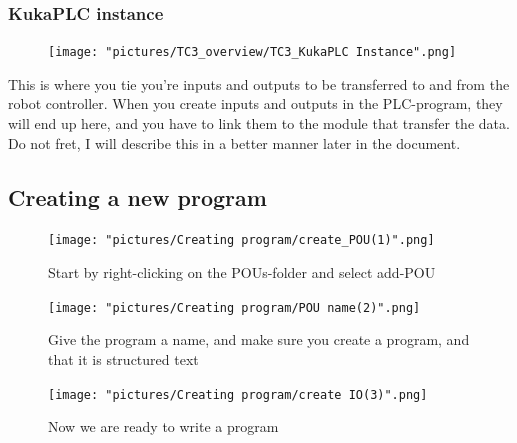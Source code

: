 \documentclass{article}
\begin{document}
\newpage

\subsubsection{KukaPLC instance}
\begin{figure}[!h]
    \centering
    \texttt{[image: "pictures/TC3\_overview/TC3\_KukaPLC Instance".png]}
    \caption{}
    \label{fig:my_label}
\end{figure}

This is where you tie you're inputs and outputs to be transferred to and from the robot controller. When you create inputs and outputs in the PLC-program, they will end up here, and you have to link them to the module that transfer the data. Do not fret, I will describe this in a better manner later in the document. 

\newpage

\subsection{Creating a new program}


\begin{figure}[!h]
    \centering
    \texttt{[image: "pictures/Creating program/create\_POU(1)".png]}
    \caption{Start by right-clicking on the POUs-folder and select add-POU}
    \label{fig:my_label}
\end{figure}

\begin{figure}[!h]
    \centering
    \texttt{[image: "pictures/Creating program/POU name(2)".png]}
    \caption{Give the program a name, and make sure you create a program, and that it is structured text}
    \label{fig:my_label}
\end{figure}

\newpage

\begin{figure}[!h]
    \centering
    \texttt{[image: "pictures/Creating program/create IO(3)".png]}
    \caption{Now we are ready to write a program}
    \label{fig:my_label}
\end{figure}
\end{document}
